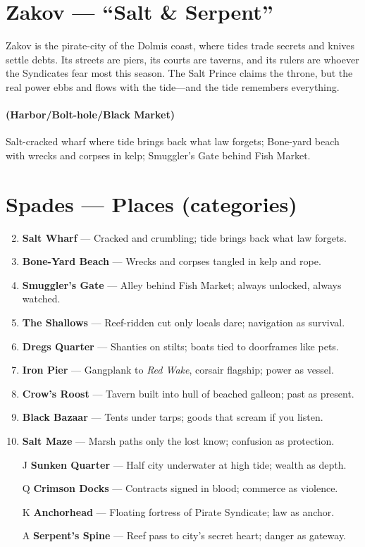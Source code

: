\section{Zakov --- ``Salt \& Serpent''}
\label{chap:zakov}

\begin{tcolorbox}[colback=black!3,colframe=black!40!white,title={Theme \& Atmosphere}]
Zakov is the pirate-city of the Dolmis coast, where tides trade secrets and knives settle debts. Its streets are piers, its courts are taverns, and its rulers are whoever the Syndicates fear most this season. The Salt Prince claims the throne, but the real power ebbs and flows with the tide---and the tide remembers everything.
\end{tcolorbox}

\paragraph*{(Harbor/Bolt-hole/Black Market)} Salt-cracked wharf where tide brings back what law forgets; Bone-yard beach with wrecks and corpses in kelp; Smuggler's Gate behind Fish Market.

\section*{Spades --- Places (categories)}
\label{sec:zakov-places}
\begin{enumerate}
\setcounter{enumi}{1}
\item \textbf{Salt Wharf} --- Cracked and crumbling; tide brings back what law forgets.
\item \textbf{Bone-Yard Beach} --- Wrecks and corpses tangled in kelp and rope.
\item \textbf{Smuggler's Gate} --- Alley behind Fish Market; always unlocked, always watched.
\item \textbf{The Shallows} --- Reef-ridden cut only locals dare; navigation as survival.
\item \textbf{Dregs Quarter} --- Shanties on stilts; boats tied to doorframes like pets.
\item \textbf{Iron Pier} --- Gangplank to \textit{Red Wake}, corsair flagship; power as vessel.
\item \textbf{Crow's Roost} --- Tavern built into hull of beached galleon; past as present.
\item \textbf{Black Bazaar} --- Tents under tarps; goods that scream if you listen.
\item \textbf{Salt Maze} --- Marsh paths only the lost know; confusion as protection.
\item[J] \textbf{Sunken Quarter} --- Half city underwater at high tide; wealth as depth.
\item[Q] \textbf{Crimson Docks} --- Contracts signed in blood; commerce as violence.
\item[K] \textbf{Anchorhead} --- Floating fortress of Pirate Syndicate; law as anchor.
\item[A] \textbf{Serpent's Spine} --- Reef pass to city's secret heart; danger as gateway.
\end{enumerate}

